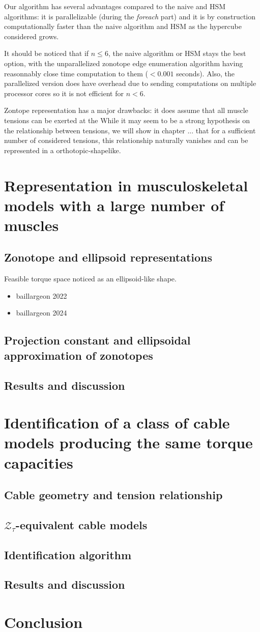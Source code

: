 Our algorithm has several advantages compared to the naive and HSM algorithms: it is parallelizable (during the \textit{foreach} part) 
and it is by construction computationally faster than the naive algorithm and HSM as the hypercube considered grows.

It should be noticed that if $n\leq 6$, the naive algorithm or HSM stays the best option, with the unparallelized zonotope edge enumeration algorithm having
reasonnably close time computation to them ($< 0.001$ seconds). Also, the parallelized version does have overhead due to sending computations on multiple processor cores 
so it is not efficient for $n < 6$. 


Zontope representation has a major drawbacks: it does assume that all muscle tensions can be exerted at the 
While it may seem to be a strong hypothesis on the relationship between tensions, we will show in chapter ...
that for a sufficient number of considered tensions, this relationship naturally vanishes and can be represented
in a orthotopic-shapelike.

\section{Representation in musculoskeletal models with a large number of muscles}
\subsection{Zonotope and ellipsoid representations}
Feasible torque space noticed as an ellipsoid-like shape.
\begin{itemize}
    \item \cite{baillargeonExperimentallyQuantifyingFeasible2022} baillargeon 2022
    \item \cite{baillargeonOlderAgeAssociated2024a} baillargeon 2024
\end{itemize}
\subsection{Projection constant and ellipsoidal approximation of zonotopes}
\subsection{Results and discussion}

\section{Identification of a class of cable models producing the same torque capacities}
\subsection{Cable geometry and tension relationship}
\subsection{$\mathcal{Z}_{\tau}$-equivalent cable models}
\subsection{Identification algorithm}
\subsection{Results and discussion}
\section{Conclusion}